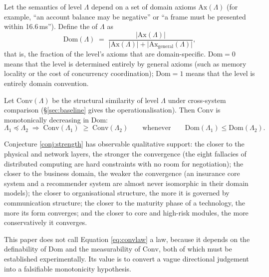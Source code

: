 \begin{definition}\label{def:dom}
Let the semantics of level $\Lambda$ depend on a set of domain axioms
$\mathrm{Ax}(\Lambda)$ (for example, ``an account balance may be negative'' or ``a frame
must be presented within 16.6\,ms''). Define the  of $\Lambda$ as
\begin{equation}\label{eq:dom}
\mathrm{Dom}(\Lambda) \;=\; \frac{\bigl|\mathrm{Ax}(\Lambda)\bigr|}
{\bigl|\mathrm{Ax}(\Lambda)\bigr| + \bigl|\mathrm{Ax}_{\text{general}}(\Lambda)\bigr|} ,
\end{equation}
that is, the fraction of the level's axioms that are domain-specific. $\mathrm{Dom} = 0$
means that the level is determined entirely by general axioms (such as memory locality or
the cost of concurrency coordination); $\mathrm{Dom} = 1$ means that the level is entirely
domain convention.
\end{definition}

\begin{conjecture}\label{conj:strength}
Let $\mathrm{Conv}(\Lambda)$ be the structural similarity of level $\Lambda$ under
cross-system comparison (\S\ref{sec:baseline} gives the operationalisation). Then
$\mathrm{Conv}$ is monotonically decreasing in $\mathrm{Dom}$:
\begin{equation}\label{eq:convlaw}
\Lambda_1 \preceq \Lambda_2 \;\Longrightarrow\;
\mathrm{Conv}(\Lambda_1) \;\ge\; \mathrm{Conv}(\Lambda_2)
\qquad \text{whenever} \qquad
\mathrm{Dom}(\Lambda_1) \le \mathrm{Dom}(\Lambda_2).
\end{equation}
\end{conjecture}

Conjecture \ref{conj:strength} has observable qualitative support: the closer to the
physical and network layers, the stronger the convergence (the eight fallacies of
distributed computing are hard constraints with no room for negotiation); the closer to the
business domain, the weaker the convergence (an insurance core system and a recommender
system are almost never isomorphic in their domain models); the closer to organisational
structure, the more it is governed by communication structure; the closer to the maturity
phase of a technology, the more its form converges; and the closer to core and high-risk
modules, the more conservatively it converges.

This paper does not call Equation \eqref{eq:convlaw} a law, because it depends on the
definability of $\mathrm{Dom}$ and the measurability of $\mathrm{Conv}$, both of which must
be established experimentally. Its value is to convert a vague directional judgement into a
falsifiable monotonicity hypothesis.

